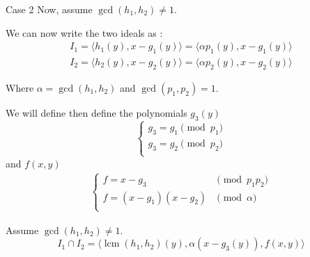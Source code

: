 \documentclass{beamer}
\DeclareMathOperator{\lcm}{lcm}
\begin{document}
\begin{frame}{Case 2}
    Now, assume $\gcd(h_{1}, {h_2}) \neq 1$.

We can now write the two ideals as :
\begin{align*}
    I_{1} = \langle h_{1}(y), x - g_{1}(y) \rangle = \langle \alpha p_{1}(y), x - g_{1}(y) \rangle \\
    I_{2} = \langle h_{2}(y), x - g_{2}(y) \rangle = \langle \alpha p_{2}(y), x - g_{2}(y) \rangle
\end{align*}

Where $\alpha = \gcd(h_{1}, h_{2})$ and $\gcd(p_{1}, p_{2}) = 1$.

We will define then define the polynomials $g_{3}(y)$
\begin{displaymath}
    \left\{
    \begin{array}{ll}
        g_{3} = g_{1} \pmod {p_{1}} \\
        g_{3} = g_{2} \pmod {p_{2}} \\
    \end{array}
    \right.
\end{displaymath}
and $f(x, y)$
\begin{align*}
    \left\{
    \begin{array}{ll}
        f = x - g_{3}           & \pmod {p_{1}p_{2}}         \\
        f = (x-g_{1})(x-g_{2})  & \pmod {\alpha}             \\
    \end{array}
    \right.
\end{align*}

\begin{theorem} \label{th:inter-2-gcd-neq-1}
    Assume $\gcd(h_{1}, h_{2}) \neq 1$.
    \begin{displaymath}
        I_{1} \cap I_{2} = \langle \lcm(h_{1}, h_{2})(y), \alpha (x - g_{3}(y)), f(x,y) \rangle
    \end{displaymath}
\end{theorem}
\end{frame}
\end{document}
